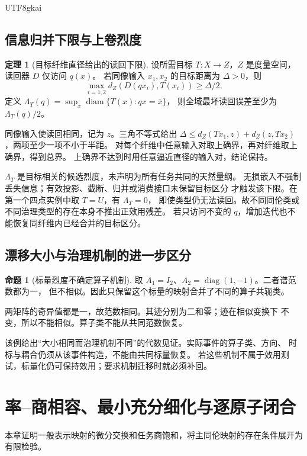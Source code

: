 \documentclass[12pt]{report}
\makeatletter
\theoremstyle{definition}
\newtheorem{theorem}{定理}[chapter]
\newtheorem{proposition}{命题}[chapter]
\renewenvironment{proof}[1][\proofname]{\par
  \pushQED{\qed}\normalfont
  \topsep6\p@\@plus6\p@\relax
  \trivlist
  \item[\hskip\labelsep\normalfont #1\@addpunct{.}]\ignorespaces
}{
  \popQED\endtrivlist\@endpefalse
}
\makeatother
\begin{document}
\begin{CJK*}{UTF8}{gkai}
\section{信息归并下限与上卷烈度}
\begin{theorem}[目标纤维直径给出的读回下限]
\label{thm:target-radius}
设所需目标 \(T:X\to Z\)，\(Z\) 是度量空间，读回器 \(D\) 仅访问 \(q(x)\)。
若同像输入 \(x_1,x_2\) 的目标距离为 \(\Delta>0\)，则
\[
\max_{i=1,2}d_Z(D(qx_i),T(x_i))\ge\Delta/2.
\]
定义 \(\Lambda_T(q)=\sup_{\bar x}\operatorname{diam}\{T(x):qx=\bar x\}\)，
则全域最坏读回误差至少为 \(\Lambda_T(q)/2\)。
\end{theorem}
\begin{proof}
同像输入使读回相同，记为 \(z\)。三角不等式给出
\(\Delta\le d_Z(Tx_1,z)+d_Z(z,Tx_2)\)，两项至少一项不小于半距。
对每个纤维中任意输入对取上确界，再对纤维取上确界，得到总界。
上确界不达到时用任意逼近直径的输入对，结论保持。
\end{proof}
\(\Lambda_T\) 是目标相关的候选烈度，未声明为所有任务共同的天然量纲。
无损嵌入不强制丢失信息；有效投影、截断、归并或消费接口未保留目标区分
才触发该下限。在第一个四点实例中取 \(T=U\)，有 \(\Lambda_T=0\)，
即使类型仍无法读回。故不同同伦类或不同治理类型的存在本身不推出正效用残差。
若只访问不变的 \(q\)，增加迭代也不能恢复同纤维内已经合并的目标区分。

\section{漂移大小与治理机制的进一步区分}
\begin{proposition}[标量烈度不确定算子机制]
\label{prop:mechanism-scalar}
取 \(A_1=I_2\)、\(A_2=\operatorname{diag}(1,-1)\)。二者谱范数都为一，
但不相似。因此只保留这个标量的映射合并了不同的算子共轭类。
\end{proposition}
\begin{proof}
两矩阵的奇异值都是一，故范数相同。其迹分别为二和零；迹在相似变换下
不变，所以不能相似。算子类不能从共同范数恢复。
\end{proof}
该例给出“大小相同而治理机制不同”的代数见证。实际事件的算子类、方向、
时标与耦合仍须从该事件构造，不能由共同标量恢复。
若这些机制不属于效用测试，标量化仍可保持效用；要求机制迁移时就必须补回。

\chapter{率--商相容、最小充分细化与逐原子闭合}
\label{sec:rate-quotient-closure}
本章证明一般表示映射的微分交换和任务商饱和，将主同伦映射的存在条件展开为有限检验。

\end{CJK*}
\end{document}
